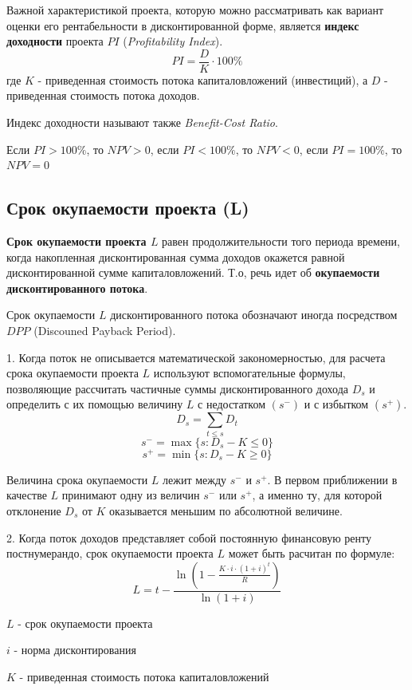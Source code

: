 \documentclass[aps,%
12pt,%
final,%
oneside,
onecolumn,%
musixtex, %
superscriptaddress,%
centertags]{article} %
\theoremstyle{plain}
\theoremstyle{definition}
\theoremstyle{remark}
\begin{document}
Важной характеристикой проекта, которую можно рассматривать как вариант оценки его рентабельности в дисконтированной форме, является \textbf{индекс доходности} проекта $PI$ (\textit{Profitability Index}).
$$PI = \frac{D}{K} \cdot 100 \%$$
где $K$ - приведенная стоимость потока капиталовложений (инвестиций), а $D$ - приведенная стоимость потока доходов.

Индекс доходности называют также \textit{Benefit-Cost Ratio}.

Если $PI >100 \% $, то $NPV>0$, если $PI <100 \% $, то $NPV<0$, если $PI  = 100 \% $, то $NPV = 0$


\subsection{Срок окупаемости проекта (L)}

\textbf{Срок окупаемости проекта $L$} равен продолжительности того периода времени, когда накопленная дисконтированная сумма доходов окажется равной дисконтированной сумме капиталовложений. Т.о, речь идет об \textbf{окупаемости дисконтированного потока}.

Срок окупаемости $L$ дисконтированного потока обозначают иногда посредством $DPP$ (Discouned Payback Period).

1. Когда поток не описывается математической закономерностью, для расчета срока окупаемости проекта $L$ используют вспомогательные формулы, позволяющие рассчитать частичные суммы дисконтированного дохода $D_s$ и определить с их помощью величину $L$ с недостатком $(s^-)$ и с избытком $(s^+)$.
$$D_s = \sum\limits_{t \leq s}D_t$$
$$s^- = \max \{s: D_s - K \leq 0\}$$
$$s^+ = \min \{s: D_s - K \geq 0\}$$ 

Величина срока окупаемости $L$ лежит между $s^-$ и $s^+$. В первом приближении в качестве $L$ принимают одну из величин $s^-$ или $s^+$, а именно ту, для которой отклонение $D_s$ от $K$ оказывается меньшим по абсолютной величине.

2. Когда поток доходов представляет собой постоянную финансовую ренту постнумерандо, срок окупаемости проекта $L$ может быть расчитан по формуле:
$$L = t - \frac{\ln \left(1 - \frac{K \cdot i \cdot (1+i)^t}{R}\right)}{\ln (1+i)}$$

$L$ - срок окупаемости проекта

$i$ - норма дисконтирования

$K$ - приведенная стоимость потока капиталовложений
\end{document}
